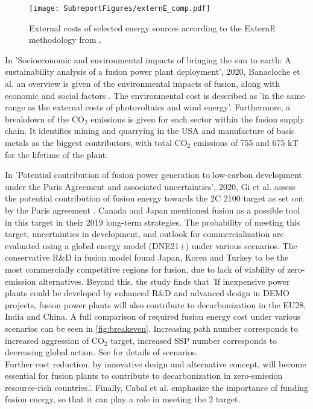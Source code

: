 \begin{figure}[h!]
    \centering
    \texttt{[image: SubreportFigures/externE\_comp.pdf]}
    \caption{ External costs of selected energy sources according to the ExternE methodology from \cite{entler2018approximation}.}
    \label{fig:externE}
\end{figure}

In 'Socioeconomic and environmental impacts of bringing the sun to earth: A
sustainability analysis of a fusion power plant deployment', 2020, Banacloche et al. an overview is given of the environmental impacts of fusion, along with economic and social factors \cite{banacloche2020socioeconomic}. The environmental cost is described as 'in the same range as the external costs of photovoltaics and wind energy'. Furthermore, a breakdown of the CO$_2$ emissions is given for each sector within the fusion supply chain. It identifies mining and quarrying in the USA and manufacture of basic metals as the biggest contributors, with total CO$_2$ emissions of 755 and 675 kT for the lifetime of the plant.

In 'Potential contribution of fusion power generation to low-carbon development under the Paris Agreement and associated uncertainties', 2020, Gi et al. assess the potential contribution of fusion energy towards the 2\degree C 2100 target as set out by the Paris agreement \cite{gi2020potential}. Canada and Japan mentioned fusion as a possible tool in this target in their 2019 long-term strategies. The probability of meeting this target, uncertainties in development, and outlook for commercialization are evaluated using a global energy model (DNE21$+$) under various scenarios. The conservative R\&D in fusion model found Japan, Korea and Turkey to be the most commercially competitive regions for fusion, due to lack of viability of zero-emission alternatives. Beyond this, the study finds that 'If inexpensive power plants could be developed by enhanced R\&D and advanced design in DEMO projects, fusion power plants will also contribute to decarbonization in the EU28, India and China. A full comparison of required fusion energy cost under various scenarios can be seen in \ref{fig:breakeven}. Increasing path number corresponds to increased aggression of CO$_2$ target, increased SSP number corresponds to decreasing global action. See \cite{gi2020potential} for details of scenarios.\\
Further cost reduction, by innovative design and alternative concept, will become essential for fusion plants to contribute to decarbonization in zero-emission resource-rich countries.'. Finally, Cabal et al. emphasize the importance of funding fusion energy, so that it can play a role in meeting the 2 target.\\\\


